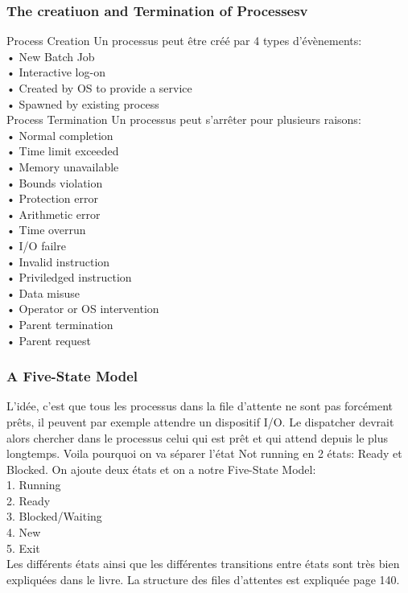 \subsubsection{The creatiuon and Termination of Processesv}
Process Creation
Un processus peut être créé par 4 types d’évènements: \\
• New Batch Job \\
• Interactive log-on \\
• Created by OS to provide a service \\
• Spawned by existing process \\
Process Termination
Un processus peut s’arrêter pour plusieurs raisons:  \\
• Normal completion \\
• Time limit exceeded \\
• Memory unavailable \\
• Bounds violation \\
• Protection error \\
• Arithmetic error \\
• Time overrun \\
• I/O failre \\
• Invalid instruction \\
• Priviledged instruction \\
• Data misuse \\
• Operator or OS intervention  \\
• Parent termination \\
• Parent request \\
\subsubsection{A Five-State Model}
L’idée, c’est que tous les processus dans la file d’attente ne sont pas forcément prêts, il peuvent par exemple attendre un dispositif I/O. Le dispatcher devrait alors chercher dans le processus celui qui est prêt et qui attend depuis le plus longtemps. Voila pourquoi on va séparer l’état Not running en 2 états: Ready et Blocked. On ajoute deux états et on a notre Five-State Model: \\
1. Running \\
2. Ready \\
3. Blocked/Waiting  \\
4. New \\
5. Exit \\
Les différents états ainsi que les différentes transitions entre états sont très bien expliquées dans le livre. La structure des files d’attentes est expliquée page 140.
